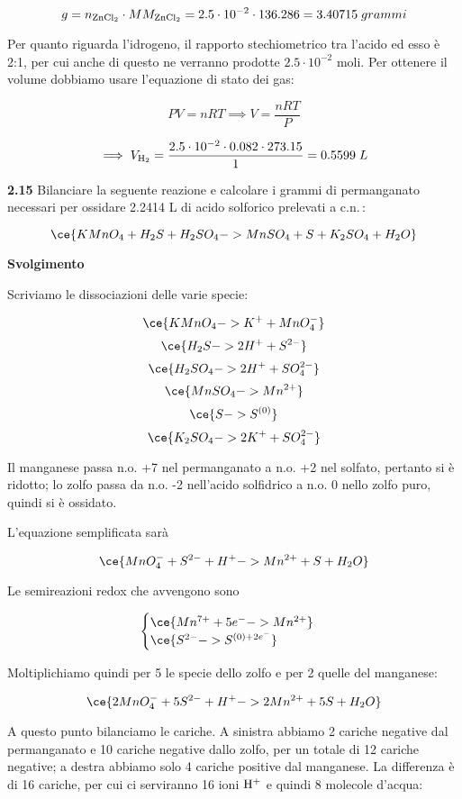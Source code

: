 $$g=n_{\rm ZnCl_2} \cdot MM_{\rm ZnCl_2}=2.5 \cdot 10^{-2} \cdot 136.286=3.40715\;grammi$$

Per quanto riguarda l'idrogeno, il rapporto stechiometrico tra l'acido ed esso è 2:1, per cui anche di questo ne verranno prodotte $2.5 \cdot 10^{-2}$ moli. Per ottenere il volume dobbiamo usare l'equazione di stato dei gas:

$$PV=nRT \implies V=\frac{nRT}{P}$$

$$\implies V_{\rm H_2}
=\frac{2.5 \cdot 10^{-2} \cdot 0.082 \cdot 273.15}{1}
=0.5599\;L$$

\vspace{0.2cm}\textbf{2.15} Bilanciare la seguente reazione e calcolare i grammi di permanganato necessari per ossidare 2.2414 L di acido solforico prelevati a c.n.\,:

$$\ce{KMnO_4 + H_2S + H_2SO_4 -> MnSO_4 + S + K_2SO_4 + H_2O}$$

\vspace{0.2cm}\large\textbf{Svolgimento}\normalsize

\vspace{0.2cm}Scriviamo le dissociazioni delle varie specie:

$$\ce{KMnO_4 -> K^+ + MnO_4^-}$$
$$\ce{H_2S -> 2H^+ + S^{2-}}$$
$$\ce{H_2SO_4 -> 2H^+ + SO_4^{2-}}$$
$$\ce{MnSO_4 -> Mn^{2+}}$$
$$\ce{S -> S^{(0)}}$$
$$\ce{K_2SO_4 -> 2K^+ + SO_4^{2-}}$$

Il manganese passa n.o. +7 nel permanganato a n.o. +2 nel solfato, pertanto si è ridotto; lo zolfo passa da n.o. -2 nell'acido solfidrico a n.o. 0 nello zolfo puro, quindi si è ossidato.

L'equazione semplificata sarà

$$\ce{MnO_4^- + S^{2-} + H^+ -> Mn^{2+} + S + H_2O}$$

Le semireazioni redox che avvengono sono

$$\begin{cases}
    \ce{Mn^{7+} + 5e^- -> Mn^{2+}}\\
    \ce{S^{2-} -> S^{(0) + 2e^-}}
\end{cases}$$

Moltiplichiamo quindi per 5 le specie dello zolfo e per 2 quelle del manganese:

$$\ce{2MnO_4^- + 5S^{2-} + H^+ -> 2Mn^{2+} + 5S + H_2O}$$

A questo punto bilanciamo le cariche. A sinistra abbiamo 2 cariche negative dal permanganato e 10 cariche negative dallo zolfo, per un totale di 12 cariche negative; a destra abbiamo solo 4 cariche positive dal manganese. La differenza è di 16 cariche, per cui ci serviranno 16 ioni $\rm H^+$ e quindi 8 molecole d'acqua:

